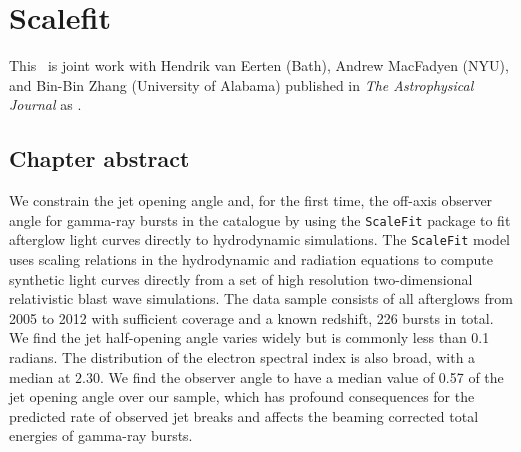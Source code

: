 \renewcommand{\chapid}{scalefit}


\newcommand{\scalefit}{{\texttt{ScaleFit}}}
\newcommand{\boxfit}{{\texttt{BoxFit}}}
\newcommand{\ramcode}{{\texttt{RAM}}}
\newcommand{\blastcode}{{\texttt{BLAST}}}
\newcommand{\ram}{{\texttt{RAM}}}
\newcommand{\emcee}{{\texttt{emcee}}}
\newcommand{\multinest}{\texttt{MultiNest}}
\newcommand{\afterglowlibrary}{{\texttt{http://cosmo.nyu.edu/afterglowlibrary/}}}


\newcommand{\ddl}{d_{L,28}}
\newcommand{\Eiso}{E_{iso}}
\newcommand{\Edl}{E_{iso, 53}}
\newcommand{\ndl}{n_{0, 0}}
\newcommand{\thO}{\theta_0}
\newcommand{\thobs}{\theta_{obs}}
\newcommand{\epse}{\epsilon_e}
\newcommand{\epsB}{\epsilon_B}
\newcommand{\xN}{\xi_N}
\newcommand{\tobs}{t_{obs}}
\newcommand{\Fp}{F_{peak}}
\newcommand{\cf}{\mathfrak{f}}
\newcommand{\cfp}{\cf_{peak}}
\newcommand{\cfm}{\cf_{m}}
\newcommand{\cfc}{\cf_{c}}
\chapter{Scalefit }

This \paper\ is joint work with Hendrik van Eerten (Bath), Andrew MacFadyen (NYU), and Bin-Bin Zhang (University of Alabama) published in \emph{The Astrophysical Journal} as \citet{Ryan15}.

\section{Chapter abstract}

We constrain the jet opening angle and, for the first time, the off-axis observer angle for gamma-ray bursts in the \swiftXRT{} catalogue by using the \scalefit{} package to fit afterglow light curves directly to hydrodynamic simulations.
The \scalefit{} model uses scaling relations in the hydrodynamic and radiation equations to compute synthetic light curves directly from a set of high resolution two-dimensional relativistic blast wave simulations.  The data sample consists of all \swiftXRT{} afterglows from 2005 to 2012 with sufficient coverage and a known redshift, 226 bursts in total.  We find the jet half-opening angle varies widely but is commonly less than 0.1 radians.  The distribution of the electron spectral index is also broad, with a median at $2.30$. 
We find the observer angle to have a median value of 0.57 of the jet opening angle over our sample, which has profound consequences for the predicted rate of observed jet breaks and affects the beaming corrected total energies of gamma-ray bursts.

